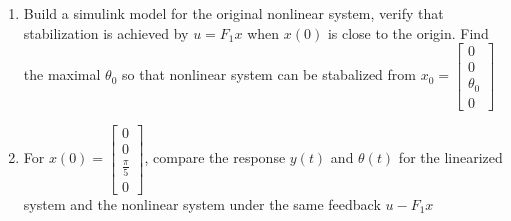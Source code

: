 {\begin{enumerate}[\arabic*.]
  \item Build a simulink model for the original nonlinear system, verify that stabilization is achieved by
    $u=F_1x$ when $x(0)$ is close to the origin. Find the maximal $\theta_0$ so that nonlinear system can be
    stabalized from $x_0 = \begin{bmatrix}0\\0\\ \theta_0\\0\end{bmatrix}$
  \item For $x(0)=\begin{bmatrix}0\\0\\\frac{\pi} 5\\0\end{bmatrix}$, compare the response $y(t)$ and
    $\theta(t)$ for the linearized system and the nonlinear system under the same feedback $u - F_1x$
  \end{enumerate}
}{}
